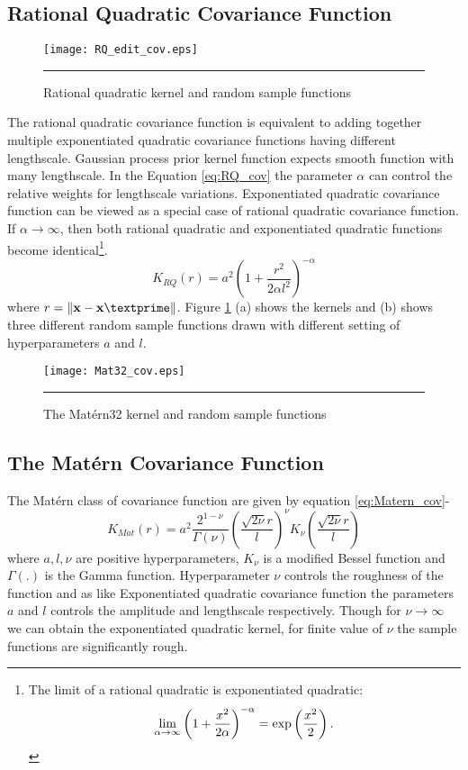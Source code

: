 \subsection{Rational Quadratic Covariance Function}
\begin{figure}
	\centering
		\texttt{[image: RQ\_edit\_cov.eps]}
		\rule{35em}{0.5pt}
	\caption[Rational quadratic kernel and random sample functions]
		{Rational quadratic kernel and random sample functions}
	\label{fig:Rational_Quadratic_covariance}
\end{figure}
The rational quadratic covariance function is equivalent to adding together multiple exponentiated quadratic covariance functions having different lengthscale. Gaussian process prior kernel function expects smooth function with many lengthscale. In the Equation \ref{eq:RQ_cov} the parameter $\alpha$ can control the relative weights for lengthscale variations. Exponentiated quadratic covariance function can be viewed as a special case of rational quadratic covariance function. If $\alpha \to \infty$, then both rational quadratic and exponentiated quadratic functions become identical\footnote{The limit of a rational quadratic is exponentiated quadratic: $$\lim_{\alpha \to \infty} \left(1+\frac{x^2}{2\alpha}\right)^{-\alpha}=\exp\left(\-\frac{x^2}{2} \right).$$}.
\begin{equation} \label{eq:RQ_cov}
K_{RQ}(r)= a^2 \left(1+ \frac{r^2}{2 \alpha l^2}\right)^{-\alpha}
\end{equation}
where $r=\lVert \textbf{x}-\textbf{x}\textprime \rVert$. Figure \ref{fig:Rational_Quadratic_covariance} (a) shows the kernels and (b) shows three different random sample functions drawn with different setting of hyperparameters $a$ and $l$.
\begin{figure}[t]
	\centering
		\texttt{[image: Mat32\_cov.eps]}
		\rule{35em}{0.5pt}
	\caption[The Mat{\'e}rn32 kernel and random sample functions]
		{The Mat{\'e}rn32 kernel and random sample functions}
	\label{fig:Matern32_covariance}
\end{figure}


\subsection{The Mat{\'e}rn Covariance Function}
The Mat{\'e}rn class of covariance function are given by equation \ref{eq:Matern_cov}-
\begin{equation} \label{eq:Matern_cov}
K_{Mat}(r)= a^2\frac{2^{1-\nu}}{\Gamma(\nu)}\left(\frac{\sqrt{2\nu}r}{l}\right)^\nu K_{\nu}
	  \left(\frac{\sqrt{2\nu}r}{l}\right)
\end{equation}
where $a, l, \nu$ are positive hyperparameters, $K_{\nu}$ is a modified Bessel function and $\Gamma \left(.\right)$ is the Gamma function. Hyperparameter $\nu$ controls the roughness of the function and as like Exponentiated quadratic covariance function the parameters $a$ and $l$ controls the amplitude and lengthscale respectively. Though for $\nu \to \infty$ we can obtain the exponentiated quadratic kernel, for finite value of $\nu$ the sample functions are significantly rough. 

